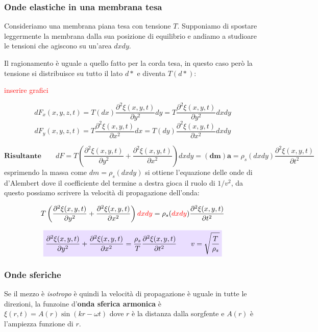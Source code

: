 \documentclass[x11names]{article}
\newcommand{\viola}[1]{\colorbox{yred}{$\displaystyle #1$}}
\begin{document}
	\subsubsection{Onde elastiche in una membrana tesa}
	Consideriamo una membrana piana tesa con tensione \(T\). Supponiamo di spostare leggermente la membrana dalla sua posizione di equilibrio e andiamo a studioare le tensioni che agiscono su un'area \(dxdy\). 
	
	Il ragionamento è uguale a quello fatto per la corda tesa, in questo caso però la tensione si distribuisce su tutto il lato \(d*\) e diventa \(T(d*)\):
	
	\begin{center}
		\textcolor{red}{inserire grafici}
	\end{center}
	
	\[ 
	dF_x(x,y,z,t) = T(dx)\frac{\partial^2 \xi(x,y,t)}{\partial y^2}dy = T\frac{\partial^2\xi(x,y,t)}{\partial y^2}dxdy
	\]
	\[ 
	dF_y(x,y,z,t) = T\frac{\partial^2 \xi(x,y,t)}{\partial x^2}dx = T(dy)\frac{\partial^2\xi(x,y,t)}{\partial x^2}dxdy 
	\]
	
	\[ 
	\textbf{Risultante} \qquad	dF = T\left(\frac{\partial^2\xi(x,y,t)}{\partial y^2} + \frac{\partial^2\xi(x,y,t)}{\partial x^2}\right)dxdy \mathbf{=(dm)a = }  \rho_s(dxdy)\frac{\partial^2\xi(x,y,t)}{\partial t^2}
	\]
	esprimendo la massa come \(dm = \rho_s (dxdy)\) si ottiene l'equazione delle onde di d'Alembert dove il coefficiente del termine a destra gioca il ruolo di \(1/v^2\), da questo possiamo scrivere la velocità di propagazione dell'onda:
	
	\[ 
	T\left(\frac{\partial^2\xi(x,y,t)}{\partial y^2} + \frac{\partial^2\xi(x,y,t)}{\partial x^2}\right)\textcolor{red}{dxdy} = \rho_s(\textcolor{red}{dxdy})\frac{\partial^2\xi(x,y,t)}{\partial t^2}
	\]
	
	
	\begin{equation}
		\viola{\frac{\partial^2\xi(x,y,t)}{\partial y^2} + \frac{\partial^2\xi(x,y,t)}{\partial x^2} = \frac{\rho_s}{T}\frac{\partial^2\xi(x,y,t)}{\partial t^2} \qquad v = \sqrt{\frac{T}{\rho_s}}}
	\end{equation}

	
	
	
	\subsubsection{Onde sferiche}
	Se il mezzo è \textit{isotropo} è quindi la velocità di propagazione è uguale in tutte le direzioni, la funzoine d'\textbf{onda sferica armonica} è \(\xi(r,t) = A(r)\sin\left(kr -\omega t\right)\) dove \(r\) è la distanza dalla sorgfente e \(A(r)\) è l'ampiezza funzione di \(r\). \\
	
\end{document}
